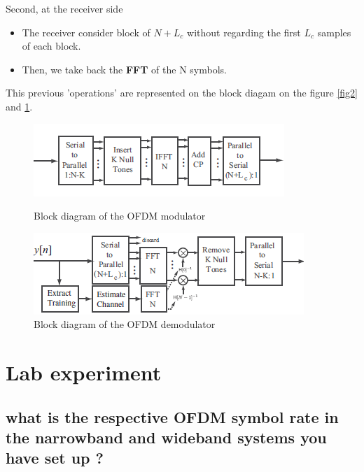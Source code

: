 \documentclass[frenchb, oneside, headings=normal]{scrartcl}
\begin{document}
Second, at the receiver side

\begin{itemize}

\item The receiver consider block of $N+L_c$ without regarding the first $L_c$ samples of each block.

\item Then, we take back the \textbf{FFT} of the N symbols.

\end{itemize}

This previous 'operations' are represented on the block diagam on the figure \ref{fig2} and \ref{fig3}.

\begin{figure}[!ht]
    \begin{minipage}[b]{0.48\linewidth}
        \centering \includegraphics[scale=0.9]{img/OFDDM_modulator.png}
     \caption{Block diagram of the OFDM modulator}
     \label{fig2}
    \end{minipage}\hfill
    \begin{minipage}[b]{0.48\linewidth}
         \centering \includegraphics[scale=0.9]{img/OFDDM_demodulator.png}
 \caption{Block diagram of the OFDM demodulator}\label{fig3}
    \end{minipage}
\end{figure}

\section{Lab experiment}

\subsection{what is the respective OFDM symbol rate in the narrowband and wideband systems you have set up ?}
\end{document}
